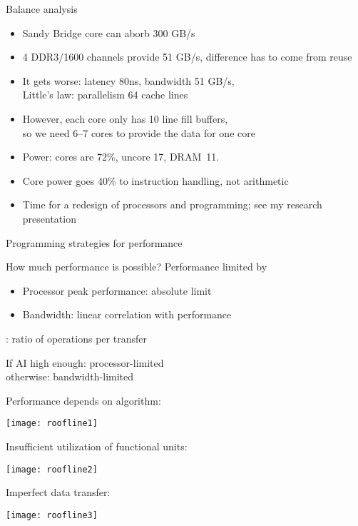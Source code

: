 \begin{frame}{Balance analysis}
  \begin{itemize}
  \item Sandy Bridge core can aborb 300 GB/s
  \item 4 DDR3/1600 channels provide 51 GB/s, difference has to come from reuse
  \item It gets worse: latency 80ns, bandwidth 51 GB/s, \\
    Little's law: parallelism 64 cache lines
  \item However, each core only has 10 line fill buffers,\\
    so we need 6--7 cores to provide the data for one core
  \item Power: cores are 72\%, uncore 17, DRAM~11.
  \item Core power goes 40\% to instruction handling, not arithmetic
  \item Time for a redesign of processors and programming; see my research presentation
  \end{itemize}
\end{frame}

 {Programming strategies for performance}

\begin{frame}{How much performance is possible?}
  Performance limited by
  \begin{itemize}
  \item Processor peak performance: absolute limit
  \item Bandwidth: linear correlation with performance
  \end{itemize}
  : ratio of operations per transfer

  If AI high enough: processor-limited\\
  otherwise: bandwidth-limited
\end{frame}

\begin{frame}
  Performance depends on algorithm:

  \texttt{[image: roofline1]}
\end{frame}

\begin{frame}
  Insufficient utilization of functional units:

  \texttt{[image: roofline2]}
\end{frame}

\begin{frame}
  Imperfect data transfer:

  \texttt{[image: roofline3]}
\end{frame}

